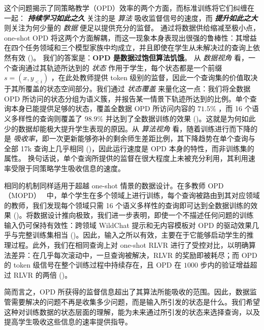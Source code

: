这个问题揭示了同策略教学（OPD）效率的两个方面，而标准训练将它们纠缠在一起：
\textit{\textbf{持续学习如此之久}} 关注的是 \textit{算法} 吸收监督信号的速度，而 \textit{\textbf{提升如此之大}} 则关注为何少量的 \textit{数据} 便足以提供充分的监督。
通过将数据供给缩减至极小点，one-shot OPD 将这两个方面解耦，而这一现象本身表现出很强的鲁棒性：其增益在四个任务领域和三个模型家族中均成立，并且即使在学生从未解决过的查询上依然有效 ()。
我们的答案是：\textbf{OPD 是数据过饱但算法饥饿}。
从 \textit{数据视角} 看，一个查询通过其轨迹所达到的 \emph{状态} 作用于学生，每个状态都是一个前缀 \(s=(x,y_{<i})\) ，在此处教师提供 token 级别的监督，因此一个查询集的价值取决于其所覆盖的状态空间部分。我们通过 \emph{状态覆盖} 来量化这一点：我们将全数据 OPD 所访问的状态分组为语义簇，并报告某一情景下轨迹所达到的比例。单个查询本身已能提供足够的状态，覆盖全数据 OPD 所访问内容的 \(71.5\%\) ，而 16 个语义多样性的查询则覆盖了 \(98.9\%\) 并达到了全数据训练的效果 ()。这就是为何如此少的数据却能极大提升学生表现的原因。从 \textit{算法视角} 看，随着训练进行而下降的是 \emph{吸收率}，即一次更新能够弥补的剩余师生差距比例，其下降趋势在单个查询与全部 17k 查询上几乎相同 ()，因此运行速度是 OPD 本身的特性，而非训练集的属性。
换句话说，单个查询所提供的监督在很大程度上未被充分利用，其利用速率受限于同策略学生吸收信息的速度。

相同的机制同样适用于超越 one-shot 情景的数据设计。在多教师 OPD（MOPD）~\citep{xiao2026mimo,xu2026deepseek} 中，单个学生在多个领域上进行训练，每个查询被路由到其对应领域的教师，我们发现每个领域只需 16 个语义多样性的查询即可达到全数据训练的效果 ()。将数据设计推向极致，我们进一步表明，即使一个不描述任何问题的训练输入仍可保持有效性：跨领域 WildChat 提示和无内容模板对 OPD 的驱动效果几乎与完整训练集相当 ()。因此，输入之所以有效，主要在于它能够启动学生的推理过程。此外，我们在相同查询上对 one-shot RLVR 进行了受控对比，以明确算法差异：在几乎每次滚动中，一旦查询被解决，RLVR 的奖励即被耗尽；而 OPD 的 token 级信号在整个训练过程中持续存在，且 OPD 在 $1000$ 步内的验证增益超过 RLVR 的两倍 ()。

简而言之，OPD 所获得的监督信息超出了其算法所能吸收的范围。因此，数据监管需要解决的问题不再是收集多少问题，而是输入所引发的状态是什么。我们希望这种对训练数据的状态层面的理解，能为未来通过所引发的状态来选择查询，以及提高学生吸收这些信息的速率提供指导。
